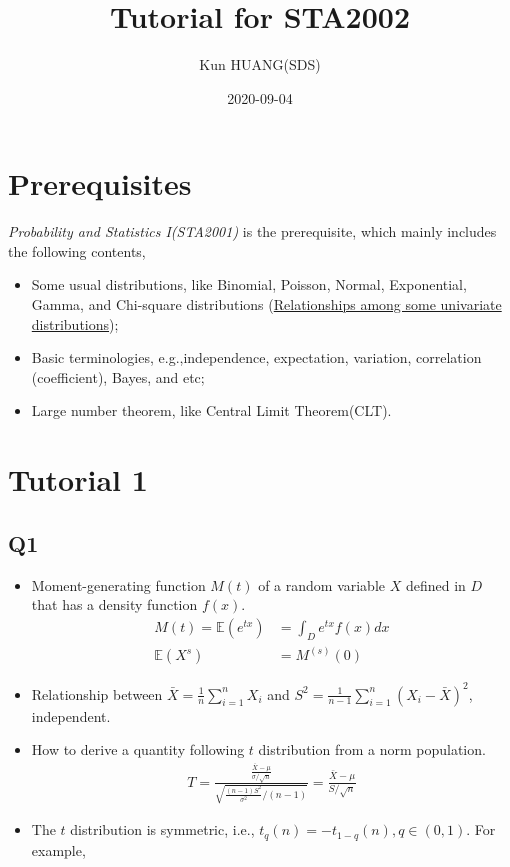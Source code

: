 \documentclass[
]{book}
\title{Tutorial for STA2002}
\author{Kun HUANG(SDS)}
\date{2020-09-04}
\theoremstyle{definition}
\theoremstyle{definition}
\theoremstyle{definition}
\theoremstyle{remark}
\begin{document}
\maketitle

{
\setcounter{tocdepth}{1}
\tableofcontents
}
\hypertarget{prerequisites}{%
\chapter{Prerequisites}\label{prerequisites}}

\emph{Probability and Statistics I(STA2001)} is the prerequisite, which mainly includes the following contents,

\begin{itemize}
\item
  Some usual distributions, like Binomial, Poisson, Normal, Exponential, Gamma, and Chi-square distributions (\href{https://www.tandfonline.com/doi/pdf/10.1080/07408170590948512?needAccess=true}{Relationships among some univariate
  distributions}\citep{song2005relationships});
\item
  Basic terminologies, e.g.,independence, expectation, variation, correlation (coefficient), Bayes, and etc;
\item
  Large number theorem, like Central Limit Theorem(CLT).
\end{itemize}

\hypertarget{sec:T1}{%
\chapter{Tutorial 1}\label{sec:T1}}

\hypertarget{q1}{%
\section{Q1}\label{q1}}

\begin{itemize}
\item
  Moment-generating function \(M(t)\) of a random variable \(X\) defined in \(D\) that has a density function \(f(x)\).
  \begin{align}
  M(t) = \mathbb{E}(e^{tx}) &= \int_{D} e^{tx}f(x)dx\\
  \mathbb{E}(X^{s}) &= M^{(s)}(0)
  \end{align}
\item
  Relationship between \(\bar X=\frac{1}{n}\sum\limits_{i=1}^n X_i\) and \(S^2=\frac{1}{n-1}\sum\limits_{i=1}^n(X_i-\bar X)^2\), independent.
\item
  How to derive a quantity following \(t\) distribution from a norm population.
  \begin{align}
  T=\frac{\frac{\bar{X}-\mu}{\sigma / \sqrt{n}}}{\sqrt{\frac{(n-1) S^{2}}{\sigma^{2}} /(n-1)}}=\frac{\bar{X}-\mu}{S / \sqrt{n}}
  \end{align}
\item
  The \(t\) distribution is symmetric, i.e., \(t_{q}(n) = -t_{1-q}(n), q\in(0,1)\). For example,
\end{itemize}
\end{document}
